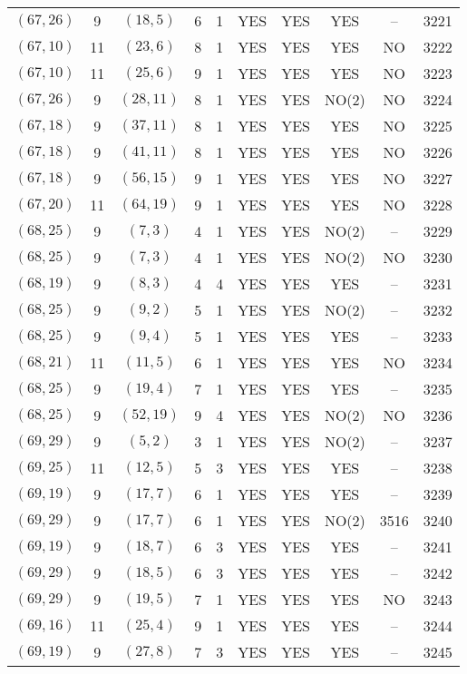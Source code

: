 \begin{longtable}{|c|c|c|c|c|c|c|c|c|c|}
$(67, 26)$ & 9 & $(18, 5)$ & 6 & 1 & YES & YES & YES & -- & 3221\\
$(67, 10)$ & 11 & $(23, 6)$ & 8 & 1 & YES & YES & YES & NO & 3222\\
$(67, 10)$ & 11 & $(25, 6)$ & 9 & 1 & YES & YES & YES & NO & 3223\\
$(67, 26)$ & 9 & $(28, 11)$ & 8 & 1 & YES & YES & NO(2) & NO & 3224\\
$(67, 18)$ & 9 & $(37, 11)$ & 8 & 1 & YES & YES & YES & NO & 3225\\
$(67, 18)$ & 9 & $(41, 11)$ & 8 & 1 & YES & YES & YES & NO & 3226\\
$(67, 18)$ & 9 & $(56, 15)$ & 9 & 1 & YES & YES & YES & NO & 3227\\
$(67, 20)$ & 11 & $(64, 19)$ & 9 & 1 & YES & YES & YES & NO & 3228\\
$(68, 25)$ & 9 & $(7, 3)$ & 4 & 1 & YES & YES & NO(2) & -- & 3229\\
$(68, 25)$ & 9 & $(7, 3)$ & 4 & 1 & YES & YES & NO(2) & NO & 3230\\
$(68, 19)$ & 9 & $(8, 3)$ & 4 & 4 & YES & YES & YES & -- & 3231\\
$(68, 25)$ & 9 & $(9, 2)$ & 5 & 1 & YES & YES & NO(2) & -- & 3232\\
$(68, 25)$ & 9 & $(9, 4)$ & 5 & 1 & YES & YES & YES & -- & 3233\\
$(68, 21)$ & 11 & $(11, 5)$ & 6 & 1 & YES & YES & YES & NO & 3234\\
$(68, 25)$ & 9 & $(19, 4)$ & 7 & 1 & YES & YES & YES & -- & 3235\\
$(68, 25)$ & 9 & $(52, 19)$ & 9 & 4 & YES & YES & NO(2) & NO & 3236\\
$(69, 29)$ & 9 & $(5, 2)$ & 3 & 1 & YES & YES & NO(2) & -- & 3237\\
$(69, 25)$ & 11 & $(12, 5)$ & 5 & 3 & YES & YES & YES & -- & 3238\\
$(69, 19)$ & 9 & $(17, 7)$ & 6 & 1 & YES & YES & YES & -- & 3239\\
$(69, 29)$ & 9 & $(17, 7)$ & 6 & 1 & YES & YES & NO(2) & 3516 & 3240\\
$(69, 19)$ & 9 & $(18, 7)$ & 6 & 3 & YES & YES & YES & -- & 3241\\
$(69, 29)$ & 9 & $(18, 5)$ & 6 & 3 & YES & YES & YES & -- & 3242\\
$(69, 29)$ & 9 & $(19, 5)$ & 7 & 1 & YES & YES & YES & NO & 3243\\
$(69, 16)$ & 11 & $(25, 4)$ & 9 & 1 & YES & YES & YES & -- & 3244\\
$(69, 19)$ & 9 & $(27, 8)$ & 7 & 3 & YES & YES & YES & -- & 3245\\

\end{longtable}
